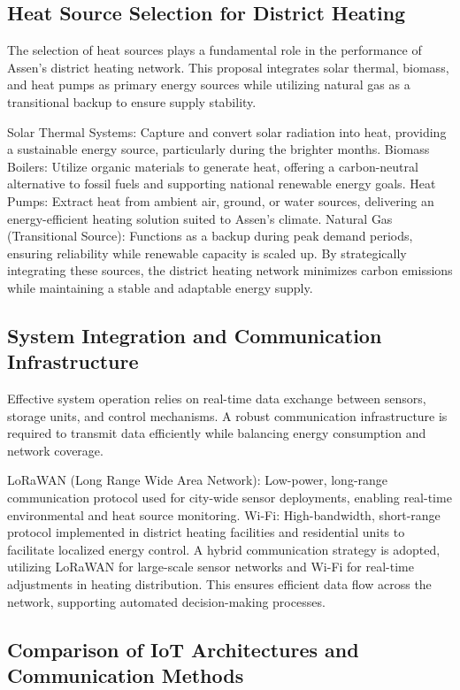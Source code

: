 \documentclass[conference]{IEEEtran}
\begin{document}
\subsection{Heat Source Selection for District Heating}

The selection of heat sources plays a fundamental role in the performance of Assen’s district heating network. This proposal integrates solar thermal, biomass, and heat pumps as primary energy sources while utilizing natural gas as a transitional backup to ensure supply stability.

Solar Thermal Systems: Capture and convert solar radiation into heat, providing a sustainable energy source, particularly during the brighter months.
Biomass Boilers: Utilize organic materials to generate heat, offering a carbon-neutral alternative to fossil fuels and supporting national renewable energy goals.
Heat Pumps: Extract heat from ambient air, ground, or water sources, delivering an energy-efficient heating solution suited to Assen’s climate.
Natural Gas (Transitional Source): Functions as a backup during peak demand periods, ensuring reliability while renewable capacity is scaled up.
By strategically integrating these sources, the district heating network minimizes carbon emissions while maintaining a stable and adaptable energy supply.

\subsection{System Integration and Communication Infrastructure}

Effective system operation relies on real-time data exchange between sensors, storage units, and control mechanisms. A robust communication infrastructure is required to transmit data efficiently while balancing energy consumption and network coverage.

LoRaWAN (Long Range Wide Area Network): Low-power, long-range communication protocol used for city-wide sensor deployments, enabling real-time environmental and heat source monitoring.
Wi-Fi: High-bandwidth, short-range protocol implemented in district heating facilities and residential units to facilitate localized energy control.
A hybrid communication strategy is adopted, utilizing LoRaWAN for large-scale sensor networks and Wi-Fi for real-time adjustments in heating distribution. This ensures efficient data flow across the network, supporting automated decision-making processes.

\subsection{Comparison of IoT Architectures and Communication Methods}
\end{document}
